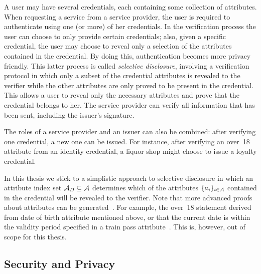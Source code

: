 A user may have several credentials, each containing some collection of
attributes. When requesting a service from a service provider,
the user is required to authenticate using one (or more)
of her credentials. In the verification process the user can choose to only
provide certain credentials; also, given a specific credential, the user may
choose to reveal only a selection of the attributes
 contained in the credential. By doing this, authentication
 becomes more privacy friendly. This latter process is
called \emph{selective disclosure}, involving
a verification protocol in which only a subset of the credential attributes
is revealed to the verifier while the other attributes are only proved to be
present in the credential. This allows a user to reveal only the necessary
attributes and prove that the credential belongs to her. The service provider
can verify all information that has been sent, including the issuer's signature.

The roles of a service provider and an issuer can also be
combined: after verifying one credential, a new one can be issued. For instance,
after verifying an \textsf{over~18} attribute from an identity
 credential, a liquor shop might choose to issue a
\textsf{loyalty} credential.

In this thesis we stick to a simplistic approach to selective disclosure in
which an attribute index set $\mathcal{A}_D \subseteq \mathcal{A}$
determines which of the attributes $\{a_i\}_{i \in \mathcal{A}}$
contained in the credential will be revealed to the verifier. Note that more
advanced proofs about attributes can be generated~\cite{IdemixCrypto2012}. For
example, the \textsf{over~18} statement  derived
from \textsf{date of birth} attribute mentioned above, or that the current date
is within the validity period specified in a \textsf{train pass}
attribute~\cite{Rogaar2011}. This is, however, out of scope for this thesis.

\subsection{Security and Privacy}

